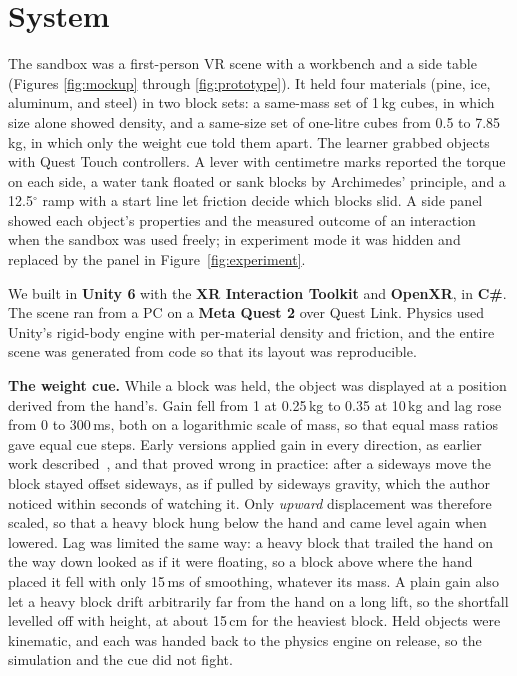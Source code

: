 \documentclass[sigconf,nonacm]{acmart}
\begin{document}
\section{System}
\label{sec:system}
The sandbox was a first-person VR scene with a workbench and a side table (Figures
\ref{fig:mockup} through \ref{fig:prototype}). It held four materials (pine, ice,
aluminum, and steel) in two block sets: a same-mass set of 1\,kg cubes, in which size
alone showed density, and a same-size set of one-litre cubes from 0.5 to 7.85\,kg, in
which only the weight cue told them apart. The learner grabbed objects with Quest
Touch controllers. A lever with centimetre marks reported the torque on each side, a
water tank floated or sank blocks by Archimedes' principle, and a 12.5$^\circ$ ramp
with a start line let friction decide which blocks slid. A side panel showed each
object's properties and the measured outcome of an interaction when the sandbox was
used freely; in experiment mode it was hidden and replaced by the panel in
Figure~\ref{fig:experiment}.

We built in \textbf{Unity 6} with the \textbf{XR Interaction Toolkit} and
\textbf{OpenXR}, in \textbf{C\#}. The scene ran from a PC on a \textbf{Meta Quest 2}
over Quest Link. Physics used Unity's rigid-body engine with per-material density and
friction, and the entire scene was generated from code so that its layout was
reproducible.

\textbf{The weight cue.} While a block was held, the object was displayed at a position
derived from the hand's. Gain fell from 1 at 0.25\,kg to 0.35 at 10\,kg and lag rose
from 0 to 300\,ms, both on a logarithmic scale of mass, so that equal mass ratios gave
equal cue steps. Early versions applied gain in every direction, as earlier
work described~\cite{dominjon2005influence}, and that proved wrong in practice: after a
sideways move the block stayed offset sideways, as if pulled by sideways gravity, which
the author noticed within seconds of watching it. Only \emph{upward} displacement was
therefore scaled, so that a heavy block hung below the hand and came level again when
lowered. Lag was limited the same way: a heavy block that trailed the hand on the way down
looked as if it were floating, so a block above where the hand placed it fell with only
15\,ms of smoothing, whatever its mass. A plain gain also let a heavy block drift arbitrarily far from the hand on a
long lift, so the shortfall levelled off with height, at about 15\,cm for the heaviest
block. Held objects were kinematic, and each was handed back to the physics engine on
release, so the simulation and the cue did not fight.
\end{document}
